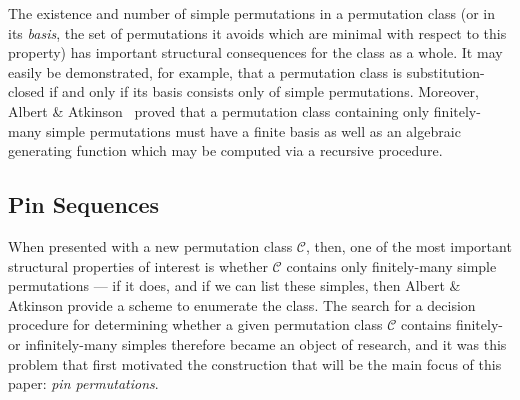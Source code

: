 \documentclass[11pt,a4paper]{article}
\theoremstyle{definition}
\begin{document}
The existence and number of simple permutations in a permutation class (or in its \emph{basis}, the set of permutations it avoids which are minimal with respect to this property) has important structural consequences for the class as a whole. It may easily be demonstrated, for example, that a permutation class is substitution-closed if and only if its basis consists only of simple permutations. Moreover, Albert \& Atkinson~\cite{albert:simple-permutat:} proved that a permutation class containing only finitely-many simple permutations must have a finite basis as well as an algebraic generating function which may be computed via a recursive procedure. 

\subsection{Pin Sequences} \label{sec:1.4}

When presented with a new permutation class $\mathcal{C}$, then, one of the most important structural properties of interest is whether $\mathcal{C}$ contains only finitely-many simple permutations --- if it does, and if we can list these simples, then Albert \& Atkinson provide a scheme to enumerate the class. The search for a decision procedure for determining whether a given permutation class $\mathcal{C}$ contains finitely- or infinitely-many simples therefore became an object of research, and it was this problem that first motivated the construction that will be the main focus of this paper: \emph{pin permutations}.
\end{document}
